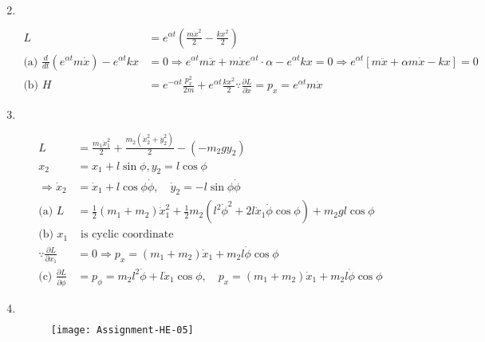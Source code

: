 \begin{enumerate}
\begin{answer}
\begin{align*}
		\end{align*}
	\end{answer}
	\item $\left. \right. $
	\begin{answer}
		\begin{align*}
		L&=e^{\alpha t}\left(\frac{m \dot{x}^{2}}{2}-\frac{k x^{2}}{2}\right)\\
		\text{(a) }\frac{d}{d t}\left(e^{\alpha t} m \dot{x}\right)-e^{\alpha t} k x&=0 \Rightarrow e^{\alpha t} m \ddot{x}+m \dot{x} e^{\alpha t} \cdot \alpha-e^{\alpha t} k x=0 \Rightarrow e^{\alpha t}[m \ddot{x}+\alpha m \dot{x}-k x]=0\\
		\text{(b) }H&=e^{-\alpha t} \frac{p_{x}^{2}}{2 m}+e^{\alpha t} \frac{k x^{2}}{2}
		\because \frac{\partial L}{\partial \dot{x}}=p_{x}=e^{\alpha t} m \dot{x}
		\end{align*}
	\end{answer}
	\item $\left. \right. $
	\begin{answer}
		\begin{align*}
		L&=\frac{m_{1} \dot{x}_{1}^{2}}{2}+\frac{m_{2}\left(\dot{x}_{2}^{2}+\dot{y}_{2}^{2}\right)}{2}-\left(-m_{2} g y_{2}\right)\\
		x_{2}&=x_{1}+l \sin \phi, y_{2}=l \cos \phi\\
		\Rightarrow \dot{x}_{2}&=\dot{x}_{1}+l \cos \phi \dot{\phi}, \quad \dot{y}_{2}=-l \sin \phi \dot{\phi}\\
		\text{(a) }L&=\frac{1}{2}\left(m_{1}+m_{2}\right) \dot{x}_{1}^{2}+\frac{1}{2} m_{2}\left(l^{2} \dot{\phi}^{2}+2 l \dot{x}_{1} \dot{\phi} \cos \phi\right)+m_{2} g l \cos \phi\\
		\text{(b) }x_{1}&\text{ is cyclic coordinate}\\
		\because \frac{\partial L}{\partial x_{1}}&=0 \Rightarrow p_{x}=\left(m_{1}+m_{2}\right) \dot{x}_{1}+m_{2} l \dot{\phi} \cos \phi\\
		\text{(c) }\frac{\partial L}{\partial \dot{\phi}}&=p_{\phi}=m_{2} l^{2} \dot{\phi}+l \dot{x}_{1} \cos \phi, \quad p_{x}=\left(m_{1}+m_{2}\right) \dot{x}_{1}+m_{2} l \dot{\phi} \cos \phi
		\end{align*}
	\end{answer}
	\item $\left. \right. $
	 \begin{figure}[H]
		\centering
		\texttt{[image: Assignment-HE-05]}
	\end{figure}
	\begin{answer}

\end{answer}
\end{enumerate}
